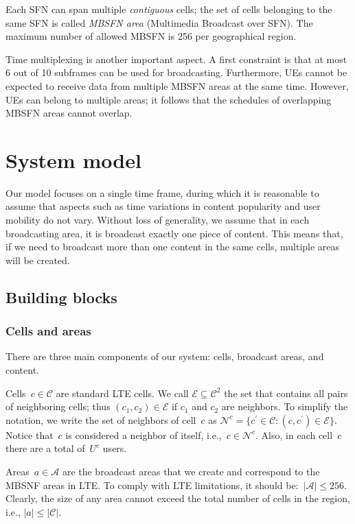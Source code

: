 \documentclass[10pt, conference, compsocconf]{IEEEtran}
\newcommand{\Cc}{\mathcal{C}}
\newcommand{\Ac}{\mathcal{A}}
\newcommand{\Nc}{\mathcal{N}}
\newcommand{\Ec}{\mathcal{E}}
\numberwithin{equation}{section}
\begin{document}
Each SFN can span multiple {\em contiguous} cells; the set of cells belonging to the
same SFN is called {\em MBSFN area} (Multimedia Broadcast over SFN). The maximum number
of allowed MBSFN is 256 per geographical region.

Time multiplexing is another important aspect. A first constraint is that
at most 6 out of 10 subframes can be used for broadcasting.
Furthermore, UEs cannot be expected to receive data
from multiple MBSFN areas at the same time. However, UEs can belong to multiple areas;
it follows that the schedules of overlapping MBSFN areas cannot overlap.



\section{System model
\label{sec:model}
}

Our model focuses on a single time frame, during which it is
reasonable to assume that aspects such as time variations
in content popularity and user mobility do not vary.
Without loss of generality, 
we assume that in each broadcasting area, it is broadcast exactly one 
piece of content. This 
means that, if we need to broadcast more than one content in the same
cells, multiple areas will be created.

\subsection{Building blocks}

\subsubsection{Cells and areas}

There are three main components of our system: cells, broadcast areas, and content.

Cells~$c\in\Cc$ are standard LTE cells. 
We call $\Ec\subseteq\Cc^2$ the set that contains all pairs of neighboring cells;
thus $(c_1,c_2)\in\Ec$ if $c_1$ and $c_2$ are neighbors.
To simplify the notation, we write the set of neighbors of cell~$c$ as $\Nc^c=\{c^{\prime}\in\Cc\colon(c,c^{\prime})\in\Ec\}$.
Notice that~$c$ is considered a neighbor of itself, i.e.,~$c\in \Nc^c$. Also, in each cell~$c$ there are a total
of~$U^c$ users.

Areas~$a\in\Ac$ are the broadcast areas that we create and  correspond to the MBSNF areas
in LTE. To comply with LTE limitations, it should be:~$|\Ac|\leq
256$. Clearly, the size of any area cannot exceed the total number of
cells in the region, i.e., $|a|\leq |\Cc|$. 
\end{document}

